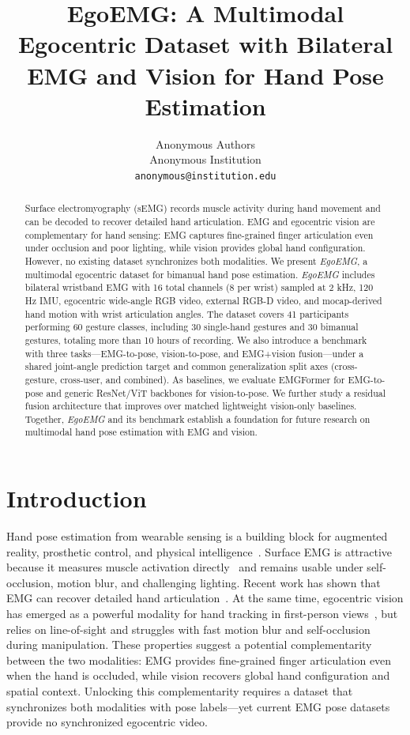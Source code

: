 \documentclass{article}
\title{EgoEMG: A Multimodal Egocentric Dataset with Bilateral EMG and Vision for Hand Pose Estimation}
\author{Anonymous Authors \\
Anonymous Institution \\
\texttt{anonymous@institution.edu} \\
}
\newcommand{\dataset}{\textit{EgoEMG}}
\newcommand{\model}{EMGFormer}
\begin{document}
\maketitle

\setlength{\textfloatsep}{8pt plus 2pt minus 2pt}
\setlength{\floatsep}{6pt plus 2pt minus 2pt}
\setlength{\intextsep}{6pt plus 2pt minus 2pt}

\begin{abstract}
Surface electromyography (sEMG) records muscle activity during hand movement and can be decoded to recover detailed hand articulation. EMG and egocentric vision are complementary for hand sensing: EMG captures fine-grained finger articulation even under occlusion and poor lighting, while vision provides global hand configuration. However, no existing dataset synchronizes both modalities. We present \dataset{}, a multimodal egocentric dataset for bimanual hand pose estimation. \dataset{} includes bilateral wristband EMG with 16 total channels (8 per wrist) sampled at 2 kHz, 120 Hz IMU, egocentric wide-angle RGB video, external RGB-D video, and mocap-derived hand motion with wrist articulation angles. The dataset covers 41 participants performing 60 gesture classes, including 30 single-hand gestures and 30 bimanual gestures, totaling more than 10 hours of recording. We also introduce a benchmark with three tasks---EMG-to-pose, vision-to-pose, and EMG+vision fusion---under a shared joint-angle prediction target and common generalization split axes (cross-gesture, cross-user, and combined). As baselines, we evaluate \model{} for EMG-to-pose and generic ResNet/ViT backbones for vision-to-pose. We further study a residual fusion architecture that improves over matched lightweight vision-only baselines. Together, \dataset{} and its benchmark establish a foundation for future research on multimodal hand pose estimation with EMG and vision.
\end{abstract}

\section{Introduction}

Hand pose estimation from wearable sensing is a building block for augmented reality, prosthetic control, and physical intelligence~\citep{emg2pose,ninapro,zhao2026dexemg}. Surface EMG is attractive because it measures muscle activation directly~\citep{farina2014} and remains usable under self-occlusion, motion blur, and challenging lighting. Recent work has shown that EMG can recover detailed hand articulation~\citep{emg2pose,emg2tendon,vqmyopose}. At the same time, egocentric vision has emerged as a powerful modality for hand tracking in first-person views~\citep{hamer,h2o}, but relies on line-of-sight and struggles with fast motion blur and self-occlusion during manipulation. These properties suggest a potential complementarity between the two modalities: EMG provides fine-grained finger articulation even when the hand is occluded, while vision recovers global hand configuration and spatial context. Unlocking this complementarity requires a dataset that synchronizes both modalities with pose labels---yet current EMG pose datasets provide no synchronized egocentric video.
\end{document}
